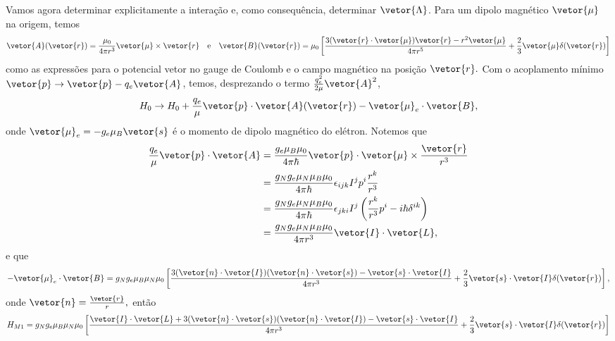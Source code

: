 Vamos agora determinar explicitamente a interação e, como consequência, determinar \(\vetor{\Lambda}\). Para um dipolo magnético \(\vetor{\mu}\) na origem, temos
\begin{equation*}
   \vetor{A}(\vetor{r}) = \frac{\mu_0}{4\pi r^3} \vetor{\mu} \times \vetor{r}\quad\text{e}\quad
   \vetor{B}(\vetor{r}) = \mu_0 \left[\frac{3 (\vetor{r} \cdot \vetor{\mu})\vetor{r} - r^2\vetor{\mu}}{4\pi r^5} + \frac23\vetor{\mu} \delta(\vetor{r})\right]
\end{equation*}
como as expressões para o potencial vetor no gauge de Coulomb e o campo magnético na posição \(\vetor{r}.\) Com o acoplamento mínimo \(\vetor{p} \to \vetor{p} - q_e \vetor{A}\), temos, desprezando o termo \(\frac{q_e^2}{2\mu} \vetor{A}^2\),
\begin{equation*}
   H_0 \to H_0 + \frac{q_e}{\mu}\vetor{p} \cdot \vetor{A}(\vetor{r}) - \vetor{\mu}_e \cdot \vetor{B},
\end{equation*}
onde \(\vetor{\mu}_e = - g_e \mu_B \vetor{s}\) é o momento de dipolo magnético do elétron. Notemos que
\begin{align*}
   \frac{q_e}{\mu}\vetor{p} \cdot \vetor{A} &= \frac{g_e \mu_B\mu_0}{4\pi\hbar} \vetor{p} \cdot \vetor{\mu} \times \frac{\vetor{r}}{r^3}\\
                                            &= \frac{g_N  g_e \mu_N\mu_B \mu_0}{4\pi\hbar} \epsilon_{ijk} I^j p^i \frac{r^k}{r^3}\\
                                            &= \frac{g_N  g_e \mu_N\mu_B \mu_0}{4\pi\hbar} \epsilon_{jki} I^j \left(\frac{r^k}{r^3} p^i - i \hbar \delta^{ik}\right)\\
                                            &= \frac{g_N g_e\mu_N \mu_B \mu_0}{4\pi r^3} \vetor{I} \cdot \vetor{L},
\end{align*}
e que
\begin{equation*}
   -\vetor{\mu}_e \cdot \vetor{B} = g_Ng_e \mu_B\mu_N \mu_0 \left[\frac{3(\vetor{n} \cdot \vetor{I})(\vetor{n}\cdot \vetor{s}) - \vetor{s}\cdot\vetor{I}}{4\pi r^3} + \frac23 \vetor{s}\cdot\vetor{I} \delta(\vetor{r})\right],
\end{equation*}
onde \(\vetor{n} = \frac{\vetor{r}}{r},\) então
\begin{equation*}
   H_{M1} = g_N g_e \mu_B \mu_N \mu_0\left[\frac{\vetor{I} \cdot \vetor{L} + 3 (\vetor{n}\cdot\vetor{s})(\vetor{n} \cdot \vetor{I}) - \vetor{s} \cdot \vetor{I}}{4\pi r^3} + \frac23 \vetor{s} \cdot \vetor{I} \delta(\vetor{r})\right]
\end{equation*}
